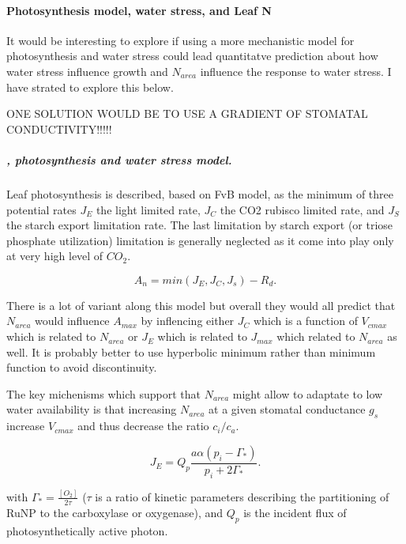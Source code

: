 \documentclass[a4paper,11pt]{article}
\begin{document}
\clearpage


\paragraph{Photosynthesis model, water stress, and Leaf N}

It would be interesting to explore if using a more mechanistic model for photosynthesis and water stress could lead quantitatve prediction about how water stress influence growth and $N_{area}$ influence the response to water stress. I have strated to explore this below.

ONE SOLUTION WOULD BE TO USE A GRADIENT OF STOMATAL CONDUCTIVITY!!!!!

\subparagraph{\citet{Collatz-1991}, photosynthesis and water stress model.}




Leaf photosynthesis is described, based on FvB model, as the minimum
of three potential rates $J_E$ the light limited rate, $J_C$ the CO2
rubisco limited rate, and $J_S$ the starch export limitation rate. The
last limitation by starch export (or triose phosphate utilization)
limitation is generally neglected as it come into play only at very
high level of $CO_2$. 

\begin{equation}
\label{eq:An}
A_n= min(J_E, J_C, J_s) - R_d.
\end{equation}

There is a lot of variant along this model but
overall they would all predict that $N_{area}$ would influence
$A_{max}$ by inflencing either $J_C$ which is a function of $V_{cmax}$
which is related to $N_{area}$ or $J_E$ which is related to $J_{max}$
which related to $N_{area}$ as well. It is probably better to use
hyperbolic minimum rather than minimum function to avoid
discontinuity. 

The key michenisms which support that $N_{area}$ might allow to
adaptate to low water availability is that increasing $N_{area}$ at a
given stomatal conductance $g_s$
increase $V_{cmax}$ and thus decrease the ratio $c_i/c_a$.


\begin{equation}
\label{eq:JC}
J_E = Q_p \frac{a \alpha (p_i - \Gamma_*)}{p_i + 2 \Gamma_*}.
\end{equation}

with $\Gamma_* = \frac{[O_2]}{2\tau}$ ($\tau$ is a ratio of kinetic parameters describing the partitioning of RuNP to the carboxylase or oxygenase), and $Q_p$ is the incident flux of photosynthetically active photon.
\end{document}
